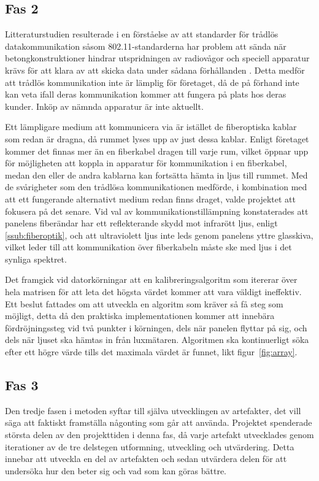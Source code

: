     \subsection{Fas 2} %
    \label{sub:steg_2}
        Litteraturstudien resulterade i en förståelse av att standarder för trådlös datakommunikation såsom 802.11-standarderna har problem att sända när betongkonstruktioner hindrar utspridningen av radiovågor och speciell apparatur krävs för att klara av att skicka data under sådana förhållanden \cite{11n}. Detta medför att trådlös kommunikation inte är lämplig för företaget, då de på förhand inte kan veta ifall deras kommunikation kommer att fungera på plats hos deras kunder. Inköp av nämnda apparatur är inte aktuellt. \bigskip

        Ett lämpligare medium att kommunicera via är istället de fiberoptiska kablar som redan är dragna, då rummet lyses upp av just dessa kablar. Enligt företaget kommer det finnas mer än en fiberkabel dragen till varje rum, vilket öppnar upp för möjligheten att koppla in apparatur för kommunikation i en fiberkabel, medan den eller de andra kablarna kan fortsätta hämta in ljus till rummet. Med de svårigheter som den trådlösa kommunikationen medförde, i kombination med att ett fungerande alternativt medium redan finns draget, valde projektet att fokusera på det senare. Vid val av kommunikationstillämpning konstaterades att panelens fiberändar har ett reflekterande skydd mot infrarött ljus, enligt \ref{ssub:fiberoptik}, och att ultraviolett ljus inte leds genom panelens yttre glasskiva, vilket leder till att kommunikation över fiberkabeln måste ske med ljus i det synliga spektret. \bigskip

        Det framgick vid datorkörningar att en kalibreringsalgoritm som itererar över hela matrisen för att leta det högsta värdet kommer att vara väldigt ineffektiv. Ett beslut fattades om att utveckla en algoritm som kräver så få steg som möjligt, detta då den praktiska implementationen kommer att innebära fördröjningssteg vid två punkter i körningen, dels när panelen flyttar på sig, och dels när ljuset ska hämtas in från luxmätaren. Algoritmen ska kontinuerligt söka efter ett högre värde tills det maximala värdet är funnet, likt figur~\ref{fig:array}.


    \subsection{Fas 3} %
    \label{sub:steg_3}
        Den tredje fasen i metoden syftar till själva utvecklingen av artefakter, det vill säga att faktiskt framställa någonting som går att använda. Projektet spenderade största delen av den projekttiden i denna fas, då varje artefakt utvecklades genom iterationer av de tre delstegen utformning, utveckling och utvärdering. Detta innebar att utveckla en del av artefakten och sedan utvärdera delen för att undersöka hur den beter sig och vad som kan göras bättre.

